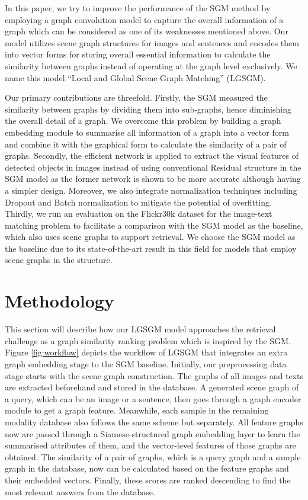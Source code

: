 \documentclass{IOS-Book-Article}
\begin{document}
In this paper, we try to improve the performance of the SGM method by employing a graph convolution model to capture the overall information of a graph which can be considered as one of its weaknesses mentioned above. Our model utilizes scene graph structures for images and sentences and encodes them into vector forms for storing overall essential information to calculate the similarity between graphs instead of operating at the graph level exclusively. We name this model ``Local and Global Scene Graph Matching'' (LGSGM). 

Our primary contributions are threefold. Firstly, the SGM measured the similarity between graphs by dividing them into sub-graphs, hence diminishing the overall detail of a graph. We overcome this problem by building a graph embedding module to summarise all information of a graph into a vector form and combine it with the graphical form to calculate the similarity of a pair of graphs. Secondly, the efficient network \cite{tan2019efficientnet} is applied to extract the visual features of detected objects in images instead of using conventional Residual structure \cite{he2016deep} in the SGM model as the former network is shown to be more accurate although having a simpler design. Moreover, we also integrate normalization techniques including Dropout and Batch normalization to mitigate the potential of overfitting. Thirdly, we run an evaluation on the Flickr30k dataset for the image-text matching problem to facilitate a comparison with the SGM model \cite{wang2020cross} as the baseline, which also uses scene graphs to support retrieval. We choose the SGM model as the baseline due to its state-of-the-art result in this field for models that employ scene graphs in the structure.


\section{Methodology}
This section will describe how our LGSGM model approaches the retrieval challenge as a graph similarity ranking problem which is inspired by the SGM. Figure \ref{fig:workflow} depicts the workflow of LGSGM that integrates an extra graph embedding stage to the SGM baseline. Initially, our preprocessing data stage starts with the scene graph construction. The graphs of all images and texts are extracted beforehand and stored in the database. A generated scene graph of a query, which can be an image or a sentence, then goes through a graph encoder module to get a graph feature.
Meanwhile, each sample in the remaining modality database also follows the same scheme but separately. All feature graphs now are passed through a Siamese-structured \cite{koch2015siamese} graph embedding layer to learn the summarised attributes of them, and the vector-level features of those graphs are obtained. The similarity of a pair of graphs, which is a query graph and a sample graph in the database, now can be calculated based on the feature graphs and their embedded vectors. Finally, these scores are ranked descending to find the most relevant answers from the database.
\end{document}
